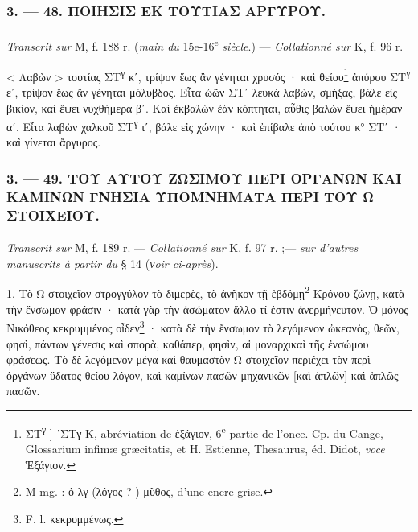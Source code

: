 \documentclass[a4paper, 11pt, oneside, polutonikogreek, french]{article}
\begin{document}
\bigskip
\centerline{\EightStarTaper}
\centerline{\EightStarTaper\EightStarTaper}
\bigskip

\subsubsection{3. --- 48. ΠΟΙΗΣΙΣ ΕΚ ΤΟΥΤΙΑΣ ΑΡΓΥΡΟΥ.}
\paragraph{}
\emph{Transcrit sur} M, f. 188 r. (\emph{main du} 15e-16\textsuperscript{e} \emph{siècle}.) --- \emph{Collationné sur} K, f. 96 r.

\bigskip

< Λαβὼν > τουτίας ΣΤ\textsuperscript{γ} κʹ, τρίψον ἕως ἂν γένηται χρυσός · καὶ θείου\footnote{ΣΤ\textsuperscript{γ} ] ῾ΣΤγ K, abréviation de ἑξάγιον, 6\textsuperscript{e} partie de l'once. Cp. du Cange, Glossarium infimæ græcitatis, et H. Estienne, Thesaurus, éd. Didot, \emph{voce} Ἑξάγιον.} ἀπύρου ΣΤ\textsuperscript{γ} εʹ, τρίψον ἕως ἂν γένηται μόλυβδος. Εἶτα ὠῶν ΣΤʹ λευκὰ λαβὼν, σμήξας, βάλε εἰς βικίον, καὶ ἕψει νυχθήμερα βʹ. Καὶ ἐκβαλὼν ἐὰν κόπτηται, αὖθις βαλὼν ἕψει ἡμέραν αʹ. Εἶτα λαβὼν χαλκοῦ ΣΤ\textsuperscript{γ} ιʹ, βάλε εἰς χώνην · καὶ ἐπίβαλε ἀπὸ τούτου κ° ΣΤʹ · καὶ γίνεται ἄργυρος.

\bigskip
\centerline{\EightStarTaper}
\centerline{\EightStarTaper\EightStarTaper}
\bigskip

\subsubsection{3. --- 49. ΤΟΥ ΑΥΤΟΥ ΖΩΣΙΜΟΥ ΠΕΡΙ ΟΡΓΑΝΩΝ ΚΑΙ ΚΑΜΙΝΩΝ ΓΝΗΣΙΑ ΥΠΟΜΝΗΜΑΤΑ ΠΕΡΙ ΤΟΥ Ω ΣΤΟΙΧΕΙΟΥ.}
\paragraph{}
\emph{Transcrit sur} M, f. 189 r. --- \emph{Collationné sur} K, f. 97 r. ;--- \emph{sur d'autres manuscrits à partir du} § 14 (\emph{νoir ci-après}).

\bigskip

1. Τὸ Ω στοιχεῖον στρογγύλον τὸ διμερὲς, τὸ ἀνῆκον τῇ ἑβδόμῃ\footnote{M mg. : ὁ λγ (λόγος ? ) μῦθος, d'une encre grise.} Κρόνου ζώνῃ, κατὰ τὴν ἔνσωμον φράσιν · κατὰ γὰρ τὴν ἀσώματον ἄλλο τί ἐστιν ἀνερμήνευτον. Ὁ μόνος Νικόθεος κεκρυμμένος οἶδεν\footnote{F. l. κεκρυμμένως.} · κατὰ δὲ τὴν ἔνσωμον τὸ λεγόμενον ὠκεανὸς, θεῶν, φησὶ, πάντων γένεσις καὶ σπορὰ, καθάπερ, φησὶν, αἱ μοναρχικαὶ τῆς ἐνσώμου φράσεως. Τὸ δὲ λεγόμενον μέγα καὶ θαυμαστὸν Ω στοιχεῖον περιέχει τὸν περὶ ὀργάνων ὕδατος θείου λόγον, καὶ καμίνων πασῶν μηχανικῶν [καὶ ἁπλῶν] καὶ ἁπλῶς πασῶν.
\end{document}
